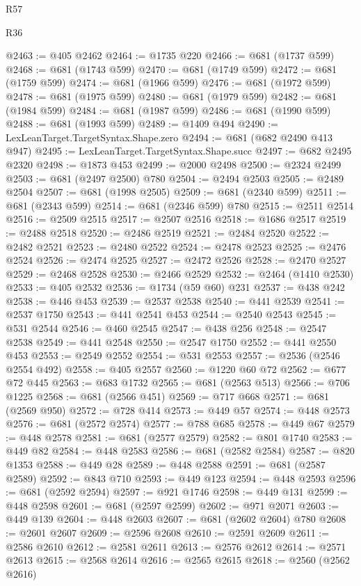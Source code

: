 \begin{lexlean}{R57}
\begin{lexlean}{R36}
\begin{coremodule}
{{{{{{{{{{{{{{{{{{{{{{{{{{{{{{{{{{{{{{{{{{{{{{{{{{{{{{{{{{{{{{{{{{{{{{{{{{{{{{{{{{@2463 := @405 @2462
@2464 := @1735 @220
@2466 := @681 (@1737 @599)
@2468 := @681 (@1743 @599)
@2470 := @681 (@1749 @599)
@2472 := @681 (@1759 @599)
@2474 := @681 (@1966 @599)
@2476 := @681 (@1972 @599)
@2478 := @681 (@1975 @599)
@2480 := @681 (@1979 @599)
@2482 := @681 (@1984 @599)
@2484 := @681 (@1987 @599)
@2486 := @681 (@1990 @599)
@2488 := @681 (@1993 @599)
@2489 := @1409 @494
@2490 := LexLeanTarget.TargetSyntax.Shape.zero
@2494 := @681 (@682 @2490 @413 @947)
@2495 := LexLeanTarget.TargetSyntax.Shape.succ
@2497 := @682 @2495 @2320
@2498 := @1873 @453
@2499 := @2000 @2498
@2500 := @2324 @2499
@2503 := @681 (@2497 @2500) @780
@2504 := @2494 @2503
@2505 := @2489 @2504
@2507 := @681 (@1998 @2505)
@2509 := @681 (@2340 @599)
@2511 := @681 (@2343 @599)
@2514 := @681 (@2346 @599) @780
@2515 := @2511 @2514
@2516 := @2509 @2515
@2517 := @2507 @2516
@2518 := @1686 @2517
@2519 := @2488 @2518
@2520 := @2486 @2519
@2521 := @2484 @2520
@2522 := @2482 @2521
@2523 := @2480 @2522
@2524 := @2478 @2523
@2525 := @2476 @2524
@2526 := @2474 @2525
@2527 := @2472 @2526
@2528 := @2470 @2527
@2529 := @2468 @2528
@2530 := @2466 @2529
@2532 := @2464 (@1410 @2530)
@2533 := @405 @2532
@2536 := @1734 (@59 @60) @231
@2537 := @438 @242
@2538 := @446 @453
@2539 := @2537 @2538
@2540 := @441 @2539
@2541 := @2537 @1750
@2543 := @441 @2541 @453
@2544 := @2540 @2543
@2545 := @531 @2544
@2546 := @460 @2545
@2547 := @438 @256
@2548 := @2547 @2538
@2549 := @441 @2548
@2550 := @2547 @1750
@2552 := @441 @2550 @453
@2553 := @2549 @2552
@2554 := @531 @2553
@2557 := @2536 (@2546 @2554 @492)
@2558 := @405 @2557
@2560 := @1220 @60 @72
@2562 := @677 @72 @445
@2563 := @683 @1732
@2565 := @681 (@2563 @513)
@2566 := @706 @1225
@2568 := @681 (@2566 @451)
@2569 := @717 @668
@2571 := @681 (@2569 @950)
@2572 := @728 @414
@2573 := @449 @57
@2574 := @448 @2573
@2576 := @681 (@2572 @2574)
@2577 := @788 @685
@2578 := @449 @67
@2579 := @448 @2578
@2581 := @681 (@2577 @2579)
@2582 := @801 @1740
@2583 := @449 @82
@2584 := @448 @2583
@2586 := @681 (@2582 @2584)
@2587 := @820 @1353
@2588 := @449 @28
@2589 := @448 @2588
@2591 := @681 (@2587 @2589)
@2592 := @843 @710
@2593 := @449 @123
@2594 := @448 @2593
@2596 := @681 (@2592 @2594)
@2597 := @921 @1746
@2598 := @449 @131
@2599 := @448 @2598
@2601 := @681 (@2597 @2599)
@2602 := @971 @2071
@2603 := @449 @139
@2604 := @448 @2603
@2607 := @681 (@2602 @2604) @780
@2608 := @2601 @2607
@2609 := @2596 @2608
@2610 := @2591 @2609
@2611 := @2586 @2610
@2612 := @2581 @2611
@2613 := @2576 @2612
@2614 := @2571 @2613
@2615 := @2568 @2614
@2616 := @2565 @2615
@2618 := @2560 (@2562 @2616)
}}}}}}}}}}}}}}}}}}}}}}}}}}}}}}}}}}}}}}}}}}}}}}}}}}}}}}}}}}}}}}}}}}}}}}}}}}}}}}}}}}
\end{coremodule}
\end{lexlean}
\end{lexlean}
